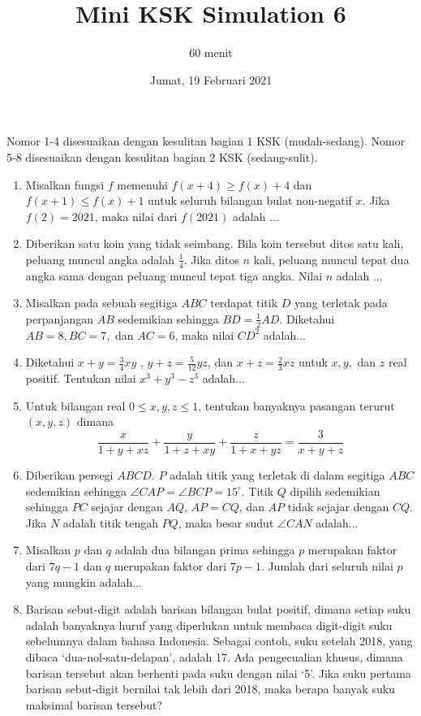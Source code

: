 \documentclass[12pt]{scrartcl}
\title{Mini KSK Simulation 6}
\author{60 menit}
\date{Jumat, 19 Februari 2021}
\begin{document}
	\maketitle

\renewcommand*\contentsname{Daftar Isi}
\tableofcontents

\newpage
	
	Nomor 1-4 disesuaikan dengan kesulitan bagian 1 KSK (mudah-sedang). Nomor 5-8 disesuaikan dengan kesulitan bagian 2 KSK (sedang-sulit).
	\begin{enumerate}
		\item
		Misalkan fungsi $f$ memenuhi $f(x+4) \ge f(x) +4$ dan $f(x+1) \le f(x)+1$ untuk seluruh bilangan bulat non-negatif $x$. Jika $f(2) = 2021$, maka nilai dari $f(2021)$ adalah ...
		
		\item
		Diberikan satu koin yang tidak seimbang. Bila koin tersebut ditos satu kali, peluang muncul angka
		adalah $\frac14$. Jika ditos $n$ kali, peluang muncul tepat dua angka sama dengan peluang muncul tepat tiga
		angka. Nilai $n$ adalah ...
		
		\item
		Misalkan pada sebuah segitiga $ABC$ terdapat titik $D$ yang terletak pada perpanjangan $AB$ sedemikian sehingga $BD = \frac12 AD$. Diketahui $AB = 8, BC=7,$ dan $AC = 6$, maka nilai $CD^2$ adalah...
		
		\item
		Diketahui $x+y=\frac34 xy$ , $y+z=\frac{5}{12}yz$, dan $x+z=\frac23xz$ untuk $x,y,$ dan $z$ real positif. Tentukan nilai $x^3+y^3-z^3$ adalah...
		
		\item
		Untuk bilangan real $0\le x,y,z \le 1$, tentukan banyaknya pasangan terurut $(x,y,z)$ dimana $$\frac{x}{1+y+xz} + \frac{y}{1+z+xy}+\frac{z}{1+x+yz}=\frac{3}{x+y+z}$$
		
		\item
		Diberikan persegi $ABCD$. $P$ adalah titik yang terletak di dalam segitiga $ABC$ sedemikian sehingga $\angle CAP = \angle BCP = 15^\circ$. Titik $Q$ dipilih sedemikian sehingga $PC$ sejajar dengan $AQ$, $AP=CQ$, dan $AP$ tidak sejajar dengan $CQ$. Jika $N$ adalah titik tengah $PQ$, maka besar sudut $\angle CAN$ adalah...
		
		\item
		Misalkan $p$ dan $q$ adalah dua bilangan prima sehingga $p$ merupakan faktor dari $7q-1$ dan $q$ merupakan faktor dari $7p-1$. Jumlah dari seluruh nilai $p$ yang mungkin adalah...
		
		\item
		Barisan sebut-digit adalah barisan bilangan bulat positif, dimana
		setiap suku adalah banyaknya huruf yang diperlukan untuk membaca
		digit-digit suku sebelumnya dalam bahasa Indonesia. Sebagai contoh,
		suku setelah 2018, yang dibaca ‘dua-nol-satu-delapan’, adalah 17.
		Ada pengecualian khusus, dimana barisan tersebut akan berhenti pada
		suku dengan nilai ‘5’.
		Jika suku pertama barisan sebut-digit bernilai tak lebih dari 2018, maka
		berapa banyak suku maksimal barisan tersebut?
	\end{enumerate}
		
\end{document}
